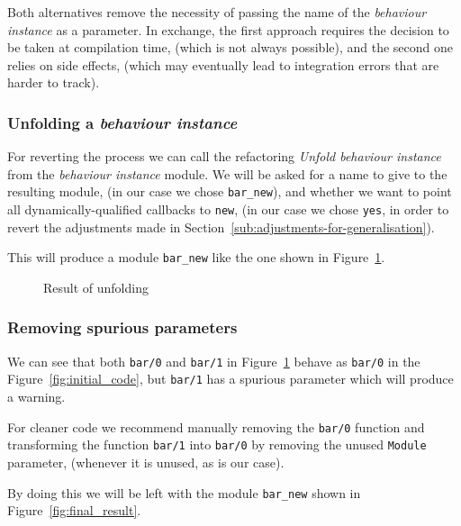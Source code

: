 Both alternatives remove the necessity of passing the name of the
\emph{behaviour instance} as a parameter. In exchange, the first approach
requires the decision to be taken at compilation time, (which is not
always possible), and the second one relies on side effects, (which
may eventually lead to integration errors that are harder to track).


\subsubsection{Unfolding a \emph{behaviour instance}}

For reverting the process we can call the refactoring \emph{Unfold
behaviour instance} from the \emph{behaviour instance} module. We
will be asked for a name to give to the resulting module, (in our
case we chose \texttt{bar\_new}), and whether we want to point all
dynamically-qualified callbacks to \texttt{new}, (in our case we chose
\texttt{yes}, in order to revert the adjustments made in Section~\ref{sub:adjustments-for-generalisation}).

This will produce a module \texttt{bar\_new} like the one shown in
Figure~\ref{fig:unfold_result}.

\begin{figure}


\caption{Result of unfolding\label{fig:unfold_result}}
\end{figure}



\subsubsection{Removing spurious parameters}

We can see that both \texttt{bar/0} and \texttt{bar/1} in Figure~\ref{fig:unfold_result}
behave as \texttt{bar/0} in the Figure~\ref{fig:initial_code}, but
\texttt{bar/1} has a spurious parameter which will produce a warning.

For cleaner code we recommend manually removing the \texttt{bar/0}
function and transforming the function \texttt{bar/1} into \texttt{bar/0}
by removing the unused \texttt{Module} parameter, (whenever it is
unused, as is our case).

By doing this we will be left with the module \texttt{bar\_new} shown
in Figure~\ref{fig:final_result}.

